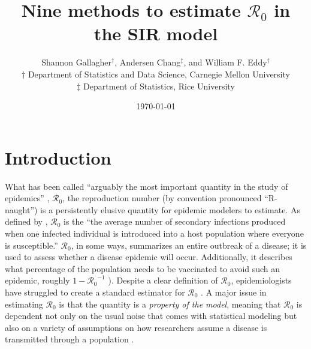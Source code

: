 \documentclass[12pt]{article}
\newcommand{\Wxxsir}{Nine }
\newcommand{\rr}{\ensuremath{\mathcal{R}_0}}
\begin{document}




\title{\Wxxsir methods to estimate $\rr$ in the SIR model}
\author{ Shannon Gallagher$^{\dag}$, Andersen Chang$^{\ddag}$, and William F. Eddy$^{\dag}$ \\$\dag$ Department of Statistics and Data Science, Carnegie Mellon University\\ $\ddag$ Department of Statistics, Rice University}
\date{\today}
\maketitle



\section{Introduction}\label{sec:intro}
What has been called ``arguably the most important quantity in the study of epidemics'' \citep{Heesterbeek2002},  $\mathcal{R}_0$, the reproduction number (by convention pronounced ``R-naught'') is a persistently elusive quantity for epidemic modelers to estimate.  As defined by \citet{anderson1992}, $\rr$ is the ``the average number of secondary infections produced when one infected individual is introduced into a host population where everyone is susceptible.''  $\rr$, in some ways, summarizes an entire outbreak of a disease; it  is used to assess whether a disease epidemic will occur.  Additionally, it describes what percentage of the population needs to be vaccinated to avoid such an epidemic, roughly $1-\rr^{-1}$ \citep{anderson1992}).  Despite a clear definition of $\rr$, epidemiologists have struggled to create a standard  estimator for $\rr$  \citep{hethcote2000}.  A major issue in estimating $\rr$ is that the quantity is a \textit{property of the model}, meaning that $\rr$ is dependent not only on the usual noise that comes with statistical modeling but also on a variety of assumptions on how researchers assume a disease is transmitted through a population \citep{diekmann2009}.
\end{document}
